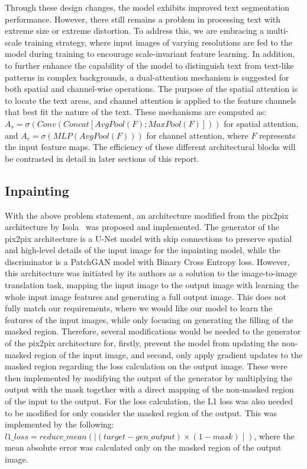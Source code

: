 \documentclass[10pt,twocolumn,letterpaper]{article}
\begin{document}
Through these design changes, the model exhibits improved text segmentation performance. However, there still remains a problem 
in processing text with extreme size or extreme distortion. To address this, we are embracing a multi-scale training strategy, where input images of varying resolutions 
are fed to the model during training to encourage scale-invariant feature learning. In addition, to further enhance the capability of the model 
to distinguish text from text-like patterns in complex backgrounds, a dual-attention mechanism is suggested for both spatial and channel-wise operations. 
The purpose of the spatial attention is to locate the text areas, and channel attention is applied to the feature channels that best fit the nature of the text. 
These mechanisms are computed as: $A_s = \sigma(Conv(Concat[AvgPool(F); MaxPool(F)]))$ for spatial attention, and $A_c = \sigma(MLP(AvgPool(F)))$ 
for channel attention, where $F$ represents the input feature maps. The efficiency of these different architectural blocks will be contrasted 
in detail in later sections of this report.

\subsection{Inpainting}

With the above problem statement, an architecture modified from the pix2pix architecture by Isola~\etal\cite{Isola2018} was proposed and implemented. The generator of the pix2pix architecture is
a U-Net model with skip connections to preserve spatial and high-level details of the input image for the inpainting model, while the discriminator is a PatchGAN
model with Binary Cross Entropy loss. However, this architecture was initiated by its authors as a solution to the image-to-image translation task, mapping the input image to the output image 
with learning the whole input image features and generating a full output image. This does not fully match our requirements, where we would like our model to learn the features of the input images, 
while only focusing on generating the filling of the masked region. Therefore, several modifications would be needed to the generator of the pix2pix architecture for, firstly, prevent the model from updating
the non-masked region of the input image, and second, only apply gradient updates to the masked region regarding the loss calculation on the output image. These were then implemented by modifying 
the output of the generator by multiplying the output with the mask together with a direct mapping of the non-masked region of the input to the output. For the loss calculation, the L1 loss was 
also needed to be modified for only consider the masked region of the output. This was implemented by the following: $l1\_loss = reduce\_mean(\mid(target - gen\_output) \times (1 - mask)\mid)$, 
where the mean absolute error was calculated only on the masked region of the output image.
\end{document}
